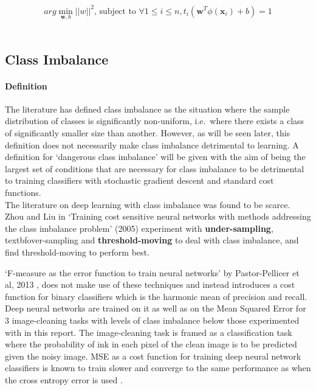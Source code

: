 \documentclass[a4paper,11pt]{article}
\begin{document}
\begin{equation}
arg\min \limits_{\textbf{w},b} ||w||^2 \text{, subject to } \forall 1 \leq i \leq n, t_i(\textbf{w}^T \phi(\textbf{x}_i)+b) = 1
\end{equation} \\


\subsection{Class Imbalance}

\paragraph{Definition}

The literature \cite{imbalance} \cite{maloof} \cite{zhou} \cite{f-measure} has defined class imbalance as the situation where the sample distribution of classes is significantly non-uniform, i.e.\ where there exists a class of significantly smaller size than another. However, as will be seen later, this definition does not necessarily make class imbalance detrimental to learning. A definition for `dangerous class imbalance' will be given with the aim of being the largest set of conditions that are necessary for class imbalance to be detrimental to training classifiers with stochastic gradient descent and standard cost functions. \\

The literature on deep learning with class imbalance was found to be scarce. Zhou and Liu in `Training cost sensitive neural networks with methods addressing the class imbalance problem' (2005) \cite{zhou} experiment with \textbf{under-sampling}, textbf{over-sampling} and \textbf{threshold-moving} to deal with class imbalance, and find threshold-moving to perform best.

`F-measure as the error function to train neural networks' by Pastor-Pellicer et al, 2013 \cite{f-measure}, does not make use of these techniques and instead introduces a cost function for binary classifiers which is the harmonic mean of precision and recall. Deep neural networks are trained on it as well as on the Mean Squared Error for 3 image-cleaning tasks with levels of class imbalance below those experimented with in this report. The image-cleaning task is framed as a classification task where the probability of ink in each pixel of the clean image is to be predicted given the noisy image. MSE as a cost function for training deep neural network classifiers is known to train slower and converge to the same performance as when the cross entropy error is used \cite{coursera}. 
\end{document}
